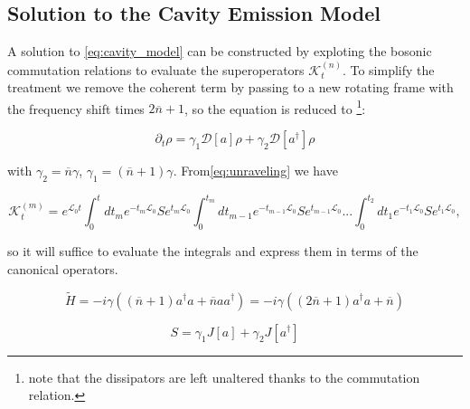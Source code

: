 \subsection{Solution to the Cavity Emission Model}
A solution to \eqref{eq:cavity_model} can be constructed by exploting the bosonic commutation relations
to evaluate the superoperators $\mathcal{K}^{(n)}_{t}$. To simplify the treatment we remove the coherent term by passing to a new rotating frame
with the frequency shift times $2\overline{n}+1$, so the equation is reduced to \footnote{note that the dissipators are left unaltered thanks to the commutation relation.}:

\begin{equation}
\partial_{t}\rho = \gamma_{1}\mathcal{D}[a]\rho + \gamma_{2}\mathcal{D}[a^{\dagger}]\rho
\end{equation}

with $\gamma_{2} = \overline{n}\gamma$, $\gamma_{1} = (\overline{n}+1)\gamma$. From\eqref{eq:unraveling} we have

\begin{equation}\label{eq:kn_operators}
  \mathcal{K}_{t}^{(m)}=e^{\mathcal{L}_{0}t}\int_{0}^{t}dt_{m}e^{-t_{m}\mathcal{L}_{0}}Se^{t_{m}\mathcal{L}_{0}}\int_{0}^{t_{m}}dt_{m-1}e^{-t_{m-1}\mathcal{L}_{0}}Se^{t_{m-1}\mathcal{L}_{0}}...\int_{0}^{t_{2}}dt_{1}e^{-t_{1}\mathcal{L}_{0}}Se^{t_{1}\mathcal{L}_{0}},
\end{equation}

so it will suffice to evaluate the integrals and express them in terms of the canonical operators.

\begin{equation}
  \tilde{H} = -i\gamma\left((\overline{n}+1)a^{\dagger}a + \overline{n}aa^{\dagger} \right) = -i\gamma\left((2\overline{n}+1)a^{\dagger}a +\overline{n}  \right)
\end{equation}

\begin{equation}
  S = \gamma_{1}J[a]+\gamma_{2}J[a^{\dagger}]
\end{equation}

